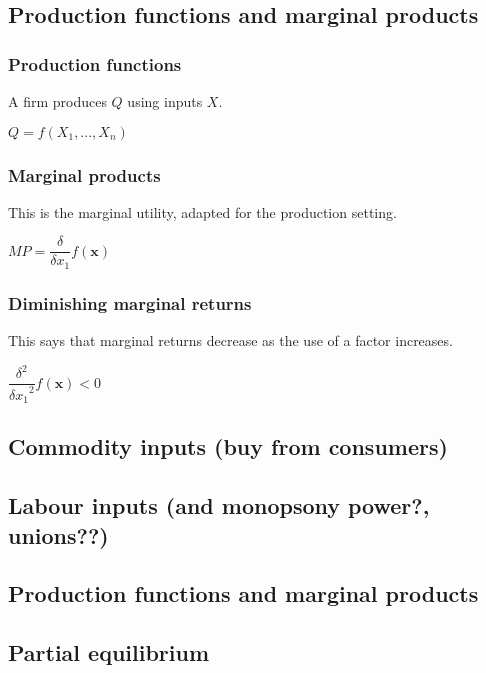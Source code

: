 
\subsection{Production functions and marginal products}

\subsubsection{Production functions}

A firm produces \(Q\) using inputs \(X\).

\(Q=f(X_1,...,X_n)\)

\subsubsection{Marginal products}

This is the marginal utility, adapted for the production setting.

\(MP=\dfrac{\delta }{\delta x_1}f(\mathbf x)\)

\subsubsection{Diminishing marginal returns}

This says that marginal returns decrease as the use of a factor increases.

\(\dfrac{\delta^2 }{{\delta x_1}^2}f(\mathbf x)<0\)



\subsection{Commodity inputs (buy from consumers)}


\subsection{Labour inputs (and monopsony power?, unions??)}
\subsection{Production functions and marginal products}
\subsection{Partial equilibrium}

